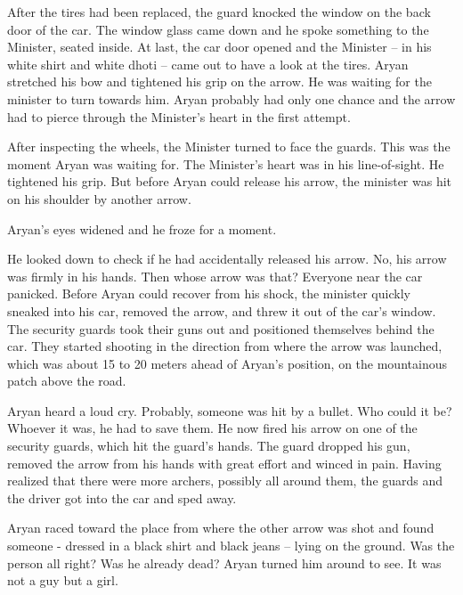 After the tires had been replaced, the guard knocked the window on the back door
of the car. The window glass came down and he spoke something to the Minister,
seated inside. At last, the car door opened and the Minister – in his white
shirt and white dhoti – came out to have a look at the tires. Aryan stretched
his bow and tightened his grip on the arrow. He was waiting for the minister to
turn towards him. Aryan probably had only one chance and the arrow had to pierce
through the Minister's heart in the first attempt.

After inspecting the wheels, the Minister turned to face the guards. This was
the moment Aryan was waiting for. The Minister's heart was in his line-of-sight.
He tightened his grip. But before Aryan could release his arrow, the minister
was hit on his shoulder by another arrow.

Aryan's eyes widened and he froze for a moment.

He looked down to check if he had accidentally released his arrow. No, his arrow
was firmly in his hands. Then whose arrow was that? Everyone near the car
panicked. Before Aryan could recover from his shock, the minister quickly
sneaked into his car, removed the arrow, and threw it out of the car's window.
The security guards took their guns out and positioned themselves behind the
car. They started shooting in the direction from where the arrow was launched,
which was about 15 to 20 meters ahead of Aryan's position, on the mountainous
patch above the road.

Aryan heard a loud cry. Probably, someone was hit by a bullet. Who could it be?
Whoever it was, he had to save them. He now fired his arrow on one of the
security guards, which hit the guard's hands. The guard dropped his gun, removed
the arrow from his hands with great effort and winced in pain. Having realized
that there were more archers, possibly all around them, the guards and the
driver got into the car and sped away.

Aryan raced toward the place from where the other arrow was shot and found
someone - dressed in a black shirt and black jeans – lying on the ground. Was
the person all right? Was he already dead? Aryan turned him around to see. It
was not a guy but a girl.
